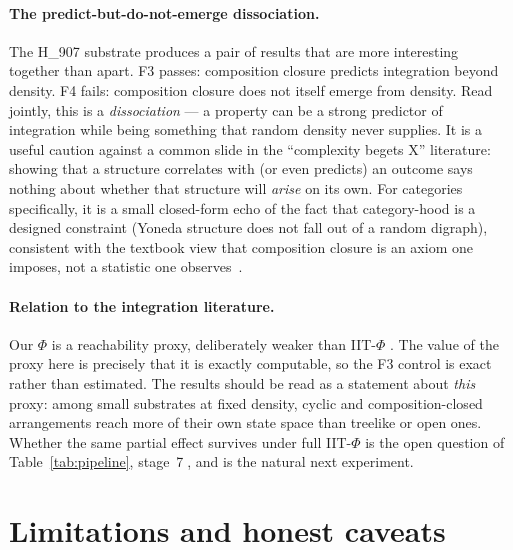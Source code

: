 \documentclass[11pt,a4paper]{article}
\begin{document}
\paragraph{The predict-but-do-not-emerge dissociation.}
The H\_907 substrate produces a pair of results that are more interesting
together than apart. F3 passes: composition closure predicts integration beyond
density. F4 fails: composition closure does not itself emerge from density. Read
jointly, this is a \emph{dissociation} --- a property can be a strong predictor
of integration while being something that random density never supplies. It is a
useful caution against a common slide in the ``complexity begets X'' literature:
showing that a structure correlates with (or even predicts) an outcome says
nothing about whether that structure will \emph{arise} on its own. For categories
specifically, it is a small closed-form echo of the fact that category-hood is a
designed constraint (Yoneda structure does not fall out of a random digraph),
consistent with the textbook view that composition closure is an axiom one
imposes, not a statistic one observes~\citep{maclane1971}.

\paragraph{Relation to the integration literature.}
Our $\Phi$ is a reachability proxy, deliberately weaker than IIT-$\Phi$
\citep{tononi2004,oizumi2014}. The value of the proxy here is precisely that it
is exactly computable, so the F3 control is exact rather than estimated. The
results should be read as a statement about \emph{this} proxy: among small
substrates at fixed density, cyclic and composition-closed arrangements reach
more of their own state space than treelike or open ones. Whether the same
partial effect survives under full IIT-$\Phi$ is the open question of
Table~\ref{tab:pipeline}, stage~\textcircled{\scriptsize 7}, and is the natural
next experiment.

\section{Limitations and honest caveats}
\label{sec:limits}
\end{document}
